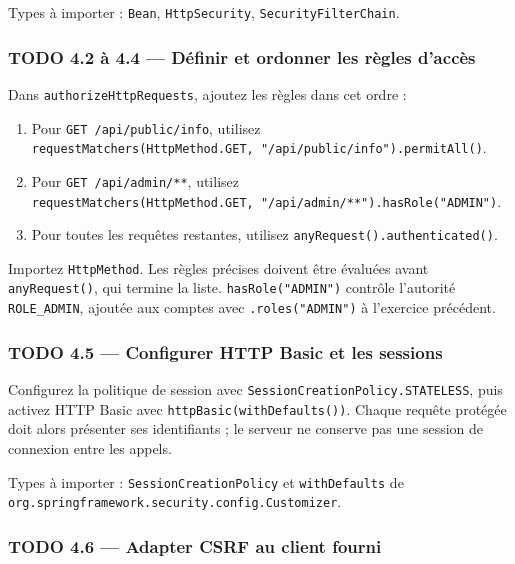 \documentclass[
  french,
  10pt,
  a4paper,
]{article}
\providecommand{\tightlist}{%
  \setlength{\itemsep}{0pt}\setlength{\parskip}{0pt}}
\begin{document}
Types à importer : \texttt{Bean}, \texttt{HttpSecurity},
\texttt{SecurityFilterChain}.

\subsubsection{TODO 4.2 à 4.4 --- Définir et ordonner les règles
d'accès}\label{todo-4.2-uxe0-4.4-duxe9finir-et-ordonner-les-ruxe8gles-daccuxe8s}

Dans \texttt{authorizeHttpRequests}, ajoutez les règles dans cet ordre :

\begin{enumerate}
\def\labelenumi{\arabic{enumi}.}
\tightlist
\item
  Pour \texttt{GET\ /api/public/info}, utilisez
  \texttt{requestMatchers(HttpMethod.GET,\ "/api/public/info").permitAll()}.
\item
  Pour \texttt{GET\ /api/admin/**}, utilisez
  \texttt{requestMatchers(HttpMethod.GET,\ "/api/admin/**").hasRole("ADMIN")}.
\item
  Pour toutes les requêtes restantes, utilisez
  \texttt{anyRequest().authenticated()}.
\end{enumerate}

Importez \texttt{HttpMethod}. Les règles précises doivent être évaluées
avant \texttt{anyRequest()}, qui termine la liste.
\texttt{hasRole("ADMIN")} contrôle l'autorité \texttt{ROLE\_ADMIN},
ajoutée aux comptes avec \texttt{.roles("ADMIN")} à l'exercice
précédent.

\subsubsection{TODO 4.5 --- Configurer HTTP Basic et les
sessions}\label{todo-4.5-configurer-http-basic-et-les-sessions}

Configurez la politique de session avec
\texttt{SessionCreationPolicy.STATELESS}, puis activez HTTP Basic avec
\texttt{httpBasic(withDefaults())}. Chaque requête protégée doit alors
présenter ses identifiants ; le serveur ne conserve pas une session de
connexion entre les appels.

Types à importer : \texttt{SessionCreationPolicy} et
\texttt{withDefaults} de
\texttt{org.springframework.security.config.Customizer}.

\subsubsection{TODO 4.6 --- Adapter CSRF au client
fourni}\label{todo-4.6-adapter-csrf-au-client-fourni}
\end{document}
